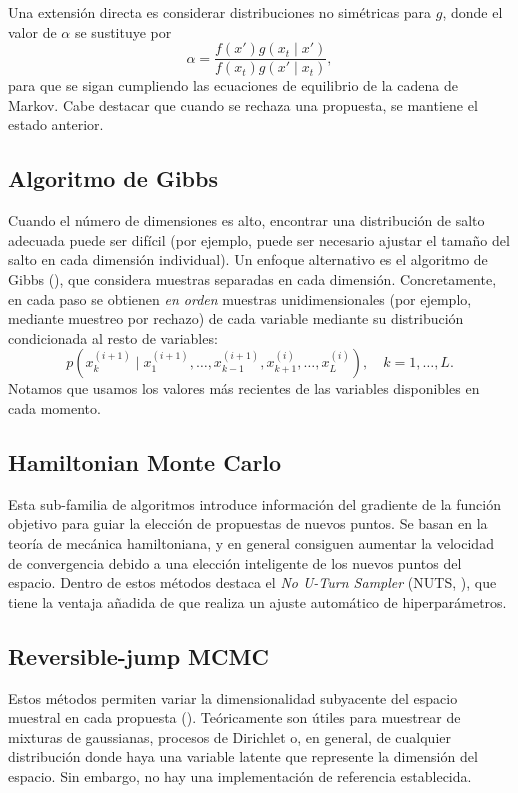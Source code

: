 \documentclass[
  a4paper,
	fontsize=11pt, %
	twoside=false, %
  secnumdepth=2,
	numbers=noenddot, %
]{kaohandt}
\begin{document}
Una extensión directa es considerar distribuciones no simétricas para \(g\), donde el valor de \(\alpha\) se sustituye por
\[
\alpha=\frac{f(x')g(x_t \mid x')}{f(x_t)g(x'\mid x_t)},
\]
para que se sigan cumpliendo las ecuaciones de equilibrio de la cadena de Markov. Cabe destacar que cuando se rechaza una propuesta, se mantiene el estado anterior.

\subsection{Algoritmo de Gibbs}

Cuando el número de dimensiones es alto, encontrar una distribución de salto adecuada puede ser difícil (por ejemplo, puede ser necesario ajustar el tamaño del salto en cada dimensión individual). Un enfoque alternativo es el algoritmo de Gibbs (), que considera muestras separadas en cada dimensión. Concretamente, en cada paso se obtienen \textit{en orden} muestras unidimensionales (por ejemplo, mediante muestreo por rechazo) de cada variable mediante su distribución condicionada al resto de variables:
\[
p(x_k^{(i+1)} \mid x_{1}^{(i+1)}, \dots, x_{k-1}^{(i+1)}, x_{k+1}^{(i)}, \dots, x_L^{(i)}), \quad k=1,\dots,L.
\]
Notamos que usamos los valores más recientes de las variables disponibles en cada momento.

\subsection{Hamiltonian Monte Carlo}

Esta sub-familia de algoritmos introduce información del gradiente de la función objetivo para guiar la elección de propuestas de nuevos puntos. Se basan en la teoría de mecánica hamiltoniana, y en general consiguen aumentar la velocidad de convergencia debido a una elección inteligente de los nuevos puntos del espacio. Dentro de estos métodos destaca el \textit{No U-Turn Sampler} (NUTS, ), que tiene la ventaja añadida de que realiza un ajuste automático de hiperparámetros.

\subsection{Reversible-jump MCMC}

Estos métodos permiten variar la dimensionalidad subyacente del espacio muestral en cada propuesta (). Teóricamente son útiles para muestrear de mixturas de gaussianas, procesos de Dirichlet o, en general, de cualquier distribución donde haya una variable latente que represente la dimensión del espacio. Sin embargo, no hay una implementación de referencia establecida.
\end{document}
